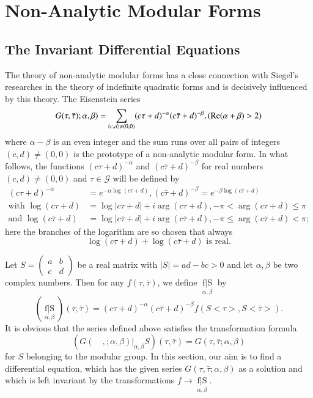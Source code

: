 \chapter{Non-Analytic Modular Forms}\label{chap4}

\section{The Invariant Differential Equations}\label{chap4:sec1}\pageoriginale

The theory of non-analytic modular forms has a close connection with
Siegel's researches in the theory of indefinite quadratic forms and is
decisively influenced by this theory. The Eisenstein series 
$$
G(\tau, \bar{\tau}); \alpha, \beta) = \sum_{(c,d) \neq (0,0)}
(c\tau+d)^{-\alpha} (c\bar{\tau}+d)^{-\beta}, (\operatorname{Re}(\alpha+\beta)>2)
$$
where $\alpha-\beta$ is an even integer and the sum runs over all
pairs of integers $(c,d)\neq (0,0)$ is the prototype of a non-analytic
modular form. In what follows, the functions $(c\tau+d)^{-\alpha}$ and
$(c\bar{\tau} +d)^{-\beta}$ for real numbers $(c,d) \neq (0,0)$ and
$\tau \in \mathscr{G}$ will be defined by
\begin{align*}
(c\tau+d)^{-\alpha} & = e^{-\alpha\log(c\tau+d)},
(c\bar{\tau}+d)^{-\beta} = e^{-\beta\log(c\bar{\tau}+d)} \\
\text{with } \log(c\tau+d) & = \log |c\tau+d| + i \arg(c\tau+d), -\pi
<\arg(c\tau + d)\leq \pi\\
\text{and } \log(c\bar{\tau}+d) & = \log |c\bar{\tau}+d| + i
\arg(c\bar{\tau}+d), -\pi \leq \arg(c\bar{\tau}+d) < \pi;
\end{align*}
here the branches of the logarithm are so chosen that always 
$$
\log (c\tau+d) + \log (c\bar{\tau}+d) \text{ is real}.
$$

Let $S = \left(\begin{smallmatrix}
a&b\\c&d\end{smallmatrix}\right)$ be a real matrix with $|S|=ad-bc>0$
and let $\alpha,\beta$ be two complex numbers. Then for any $f(\tau,
\bar{\tau})$, we define $\mathop{f|S}\limits_{\alpha, \beta}$ by
$$
(\mathop{f|S}\limits_{\alpha, \beta})(\tau,\bar{\tau}) =
(c\tau+d)^{-\alpha} (c\bar{\tau}+d)^{-\beta} f(S<\tau>, S<\bar{\tau}>).
$$ 
It is obvious that the series defined above satisfies the
transformation formula \pageoriginale 
$$
(G(\quad,;\alpha,\beta)|_{\alpha, \beta}S) (\tau,\bar{\tau}) = G
(\tau, \bar{\tau};\alpha, \beta)
$$
for $S$ belonging to the modular group. In this section, our aim is to
find a differential equation, which has the given series $G(\tau,
\bar{\tau}; \alpha, \beta)$ as a solution and which is left invariant
by the transformations $f\to \mathop{f|S}\limits_{\alpha,\beta}$.

